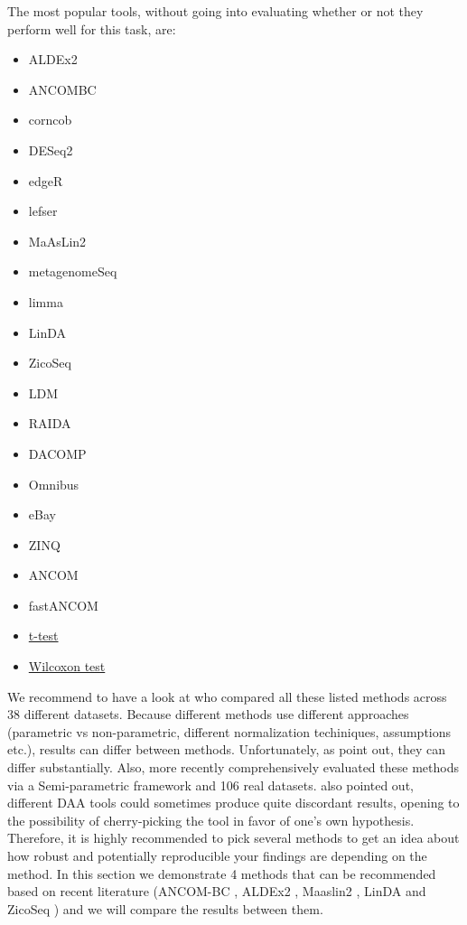 \documentclass[
]{book}
\providecommand{\tightlist}{%
  \setlength{\itemsep}{0pt}\setlength{\parskip}{0pt}}
\begin{document}
The most popular tools, without going into evaluating whether or not they perform well for this task, are:

\begin{itemize}
\tightlist
\item
  ALDEx2 \citep{Gloor2016}
\item
  ANCOMBC \citep{ancombc2020}
\item
  corncob \citep{Martin2021}
\item
  DESeq2 \citep{Love2014}
\item
  edgeR \citep{Chen2016}
\item
  lefser \citep{Khlebrodova2021}
\item
  MaAsLin2 \citep{Mallick2020}
\item
  metagenomeSeq \citep{Paulson2017}
\item
  limma \citep{Ritchie2015}
\item
  LinDA \citep{Zhou2022}
\item
  ZicoSeq \citep{Yang2022}
\item
  LDM \citep{Hu2020}
\item
  RAIDA \citep{Sohn2015}
\item
  DACOMP \citep{Brill2019}
\item
  Omnibus \citep{Omnibus2018}
\item
  eBay \citep{Liu2020}
\item
  ZINQ \citep{Ling2021}
\item
  ANCOM \citep{Mandal2015}
\item
  fastANCOM \citep{fastANCOM2022}
\item
  \href{https://www.rdocumentation.org/packages/stats/versions/3.6.2/topics/t.test}{t-test}\\
\item
  \href{https://www.rdocumentation.org/packages/stats/versions/3.6.2/topics/wilcox.test}{Wilcoxon test}
\end{itemize}

We recommend to have a look at \citet{Nearing2022}
who compared all these listed methods across 38
different datasets. Because different methods use different approaches
(parametric vs non-parametric, different normalization techiniques, assumptions
etc.), results can differ between methods.
Unfortunately, as \citet{Nearing2022} point out, they can differ substantially. Also, more recently \citet{Yang2022} comprehensively evaluated these methods via a Semi-parametric framework and 106 real datasets. \citet{Yang2022} also pointed out, different DAA tools could sometimes produce quite discordant results, opening to the possibility of cherry-picking the tool in favor of one's own hypothesis. Therefore, it is highly recommended to pick several methods to get an idea about how robust and potentially reproducible your findings are depending on the method. In this section we demonstrate 4 methods that can be recommended based on recent literature (ANCOM-BC \citep{ancombc2020}, ALDEx2 \citep{Gloor2016}, Maaslin2 \citep{Mallick2020}, LinDA \citep{Zhou2022} and ZicoSeq \citep{Yang2022}) and we will compare the results between them.
\end{document}
